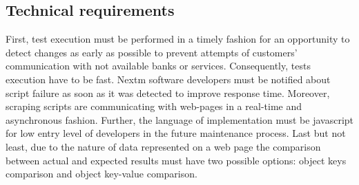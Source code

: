 \subsection{Technical requirements}
First, test execution must be performed in a timely fashion for an opportunity to detect changes as early as possible to prevent attempts of customers' communication with not available banks or services. Consequently, tests execution have to be fast. 
Nextm software developers must be notified about script failure as soon as it was detected to improve response time. 
Moreover, scraping scripts are communicating with web-pages in a real-time and asynchronous fashion. 
Further, the language of implementation must be javascript for low entry level of developers in the future maintenance process. 
Last but not least, due to the nature of data represented on a web page the comparison between actual and expected results must have two possible options: object keys comparison and object key-value comparison.


